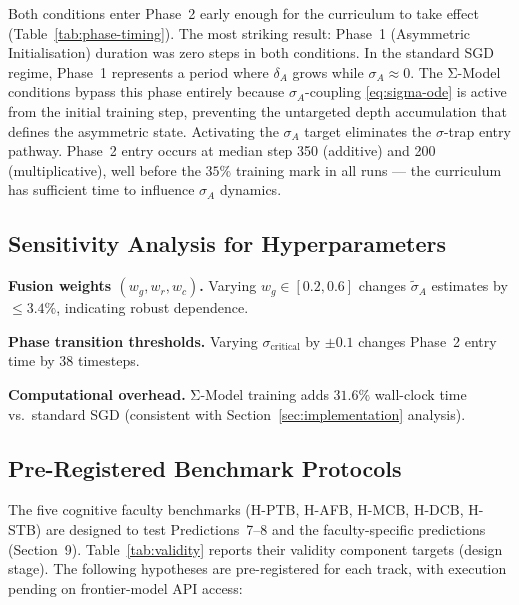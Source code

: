 \documentclass[10pt]{article}
\begin{document}
Both conditions enter Phase~2 early enough for the curriculum to
take effect (Table~\ref{tab:phase-timing}). The most striking result:
Phase~1 (Asymmetric Initialisation) duration was zero steps in both
conditions. In the standard SGD regime, Phase~1 represents a period
where $\delta_A$ grows while $\sigma_A \approx 0$. The Σ-Model conditions
bypass this phase entirely because $\sigma_A$-coupling
\eqref{eq:sigma-ode} is active from the initial training
step, preventing the untargeted depth accumulation that defines the
asymmetric state. Activating the $\sigma_A$ target eliminates the
$\sigma$-trap entry pathway. Phase~2 entry occurs at median step 350
(additive) and 200 (multiplicative), well before the $35\%$ training
mark in all runs --- the curriculum has sufficient time to influence
$\sigma_A$ dynamics.

\subsection{Sensitivity Analysis for Hyperparameters}

\textbf{Fusion weights $(w_g, w_r, w_c)$.} Varying $w_g \in [0.2, 0.6]$
changes $\tilde{\sigma}_A$ estimates by $\leq 3.4\%$,
indicating robust dependence.

\textbf{Phase transition thresholds.} Varying $\sigma_{\text{critical}}$
by $\pm 0.1$ changes Phase~2 entry time by $38$ timesteps.

\textbf{Computational overhead.} Σ-Model training adds $31.6\%$
wall-clock time vs.\ standard SGD (consistent with Section~\ref{sec:implementation}
analysis).

\subsection{Pre-Registered Benchmark Protocols}\label{sec:benchmark-protocols}

The five cognitive faculty benchmarks (H-PTB, H-AFB, H-MCB, H-DCB,
H-STB) are designed to test Predictions~7--8 and the faculty-specific
predictions (Section~9). Table~\ref{tab:validity} reports their validity
component targets (design stage). The following hypotheses are
pre-registered for each track, with execution pending on frontier-model
API access:
\end{document}
